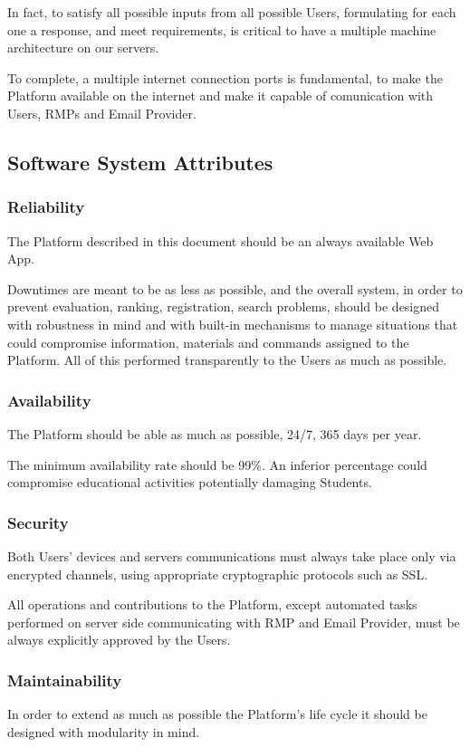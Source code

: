 In fact, to satisfy all possible inputs from all possible Users, formulating for each one a response, and meet requirements, is critical to have a multiple machine architecture on our servers. 

To complete, a multiple internet connection ports is fundamental, to make the Platform available on the internet and make it capable of comunication with Users, RMPs and Email Provider.

\subsection{Software System Attributes}

\subsubsection{Reliability}
The Platform described in this document should be an always available Web App. 

Downtimes are meant to be as less as possible, and the overall system, in order to prevent evaluation, ranking, registration, search problems, should be designed with robustness in mind and with built-in mechanisms to manage situations 
that could compromise information, materials and commands assigned to the Platform. All of this performed transparently to the Users as much as possible.

\subsubsection{Availability}
The Platform should be able as much as possible, 24/7, 365 days per year. 

The minimum availability rate should be 99\%. An inferior percentage could compromise educational activities potentially damaging Students.

\subsubsection{Security}
Both Users' devices and servers communications must always take place only via encrypted channels, using appropriate cryptographic protocols such as SSL. 

All operations and contributions to the Platform, except automated tasks performed on server side communicating with RMP and Email Provider, must be always explicitly approved by the Users.

\subsubsection{Maintainability}
In order to extend as much as possible the Platform's life cycle it should be designed with modularity in mind. 

